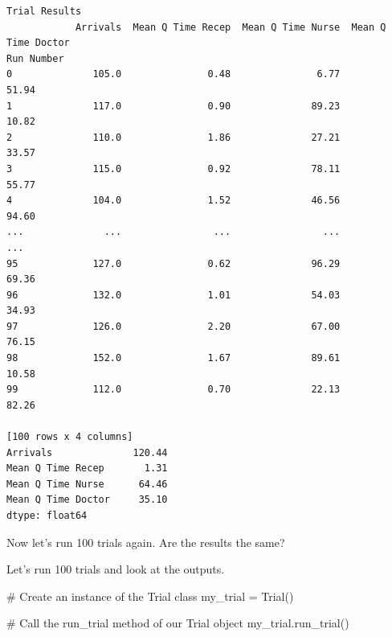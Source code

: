 \documentclass[
  letterpaper,
  DIV=11,
  numbers=noendperiod]{scrreprt}
\newenvironment{Shaded}{}{}
\newcommand{\CommentTok}[1]{\textcolor[rgb]{0.42,0.45,0.49}{#1}}
\newcommand{\NormalTok}[1]{\textcolor[rgb]{0.14,0.16,0.18}{#1}}
\newcommand{\OperatorTok}[1]{\textcolor[rgb]{0.14,0.16,0.18}{#1}}
\begin{document}
\begin{verbatim}
Trial Results
            Arrivals  Mean Q Time Recep  Mean Q Time Nurse  Mean Q Time Doctor
Run Number                                                                    
0              105.0               0.48               6.77               51.94
1              117.0               0.90              89.23               10.82
2              110.0               1.86              27.21               33.57
3              115.0               0.92              78.11               55.77
4              104.0               1.52              46.56               94.60
...              ...                ...                ...                 ...
95             127.0               0.62              96.29               69.36
96             132.0               1.01              54.03               34.93
97             126.0               2.20              67.00               76.15
98             152.0               1.67              89.61               10.58
99             112.0               0.70              22.13               82.26

[100 rows x 4 columns]
Arrivals              120.44
Mean Q Time Recep       1.31
Mean Q Time Nurse      64.46
Mean Q Time Doctor     35.10
dtype: float64
\end{verbatim}

Now let's run 100 trials again. Are the results the same?

Let's run 100 trials and look at the outputs.

\begin{Shaded}
\begin{Highlighting}[]
\CommentTok{\# Create an instance of the Trial class}
\NormalTok{my\_trial }\OperatorTok{=}\NormalTok{ Trial()}

\CommentTok{\# Call the run\_trial method of our Trial object}
\NormalTok{my\_trial.run\_trial()}
\end{Highlighting}
\end{Shaded}
\end{document}
